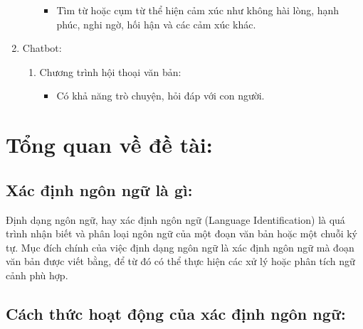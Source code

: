 \begin{enumerate}
\begin{enumerate}
            \begin{itemize}
                \item Tìm từ hoặc cụm từ thể hiện cảm xúc như không hài lòng, hạnh phúc, nghi ngờ, hối hận và các cảm xúc khác.
            \end{itemize}
        \end{enumerate}
        \item Chatbot:
        \begin{enumerate}
            \item Chương trình hội thoại văn bản:
            \begin{itemize}
                \item Có khả năng trò chuyện, hỏi đáp với con người. 
            \end{itemize}
        \end{enumerate}
    \end{enumerate}
    
\section{Tổng quan về đề tài:}

\subsection{Xác định ngôn ngữ là gì:}

Định dạng ngôn ngữ, hay xác định ngôn ngữ (Language Identification) là quá trình nhận biết và phân loại ngôn ngữ của một đoạn văn bản hoặc một chuỗi ký tự. Mục đích chính của việc định dạng ngôn ngữ là xác định ngôn ngữ mà đoạn văn bản được viết bằng, để từ đó có thể thực hiện các xử lý hoặc phân tích ngữ cảnh phù hợp.

\subsection{Cách thức hoạt động của xác định ngôn ngữ:}

